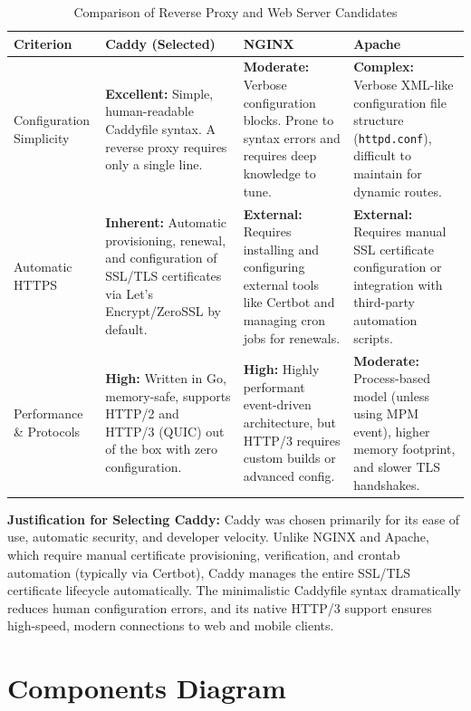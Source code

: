 \documentclass[letterpaper%
, oneside%
, 12pt%
, memoireprojet%
, english%
,creativecommons,hyperref, withAlgo2e %
]{thETS}
\begin{document}
\begin{table}[H]
\centering
\begin{tabular}{|p{2.5cm}|p{4.2cm}|p{4.2cm}|p{4.2cm}|}
\hline
\textbf{Criterion} & \textbf{Caddy (Selected)} & \textbf{NGINX} & \textbf{Apache} \\ \hline
Configuration Simplicity & \textbf{Excellent:} Simple, human-readable Caddyfile syntax. A reverse proxy requires only a single line. & \textbf{Moderate:} Verbose configuration blocks. Prone to syntax errors and requires deep knowledge to tune. & \textbf{Complex:} Verbose XML-like configuration file structure (\texttt{httpd.conf}), difficult to maintain for dynamic routes. \\ \hline
Automatic HTTPS & \textbf{Inherent:} Automatic provisioning, renewal, and configuration of SSL/TLS certificates via Let's Encrypt/ZeroSSL by default. & \textbf{External:} Requires installing and configuring external tools like Certbot and managing cron jobs for renewals. & \textbf{External:} Requires manual SSL certificate configuration or integration with third-party automation scripts. \\ \hline
Performance \& Protocols & \textbf{High:} Written in Go, memory-safe, supports HTTP/2 and HTTP/3 (QUIC) out of the box with zero configuration. & \textbf{High:} Highly performant event-driven architecture, but HTTP/3 requires custom builds or advanced config. & \textbf{Moderate:} Process-based model (unless using MPM event), higher memory footprint, and slower TLS handshakes. \\ \hline
\end{tabular}
\caption{Comparison of Reverse Proxy and Web Server Candidates}
\label{tab:proxy_comparison}
\end{table}

\textbf{Justification for Selecting Caddy:} Caddy was chosen primarily for its ease of use, automatic security, and developer velocity. Unlike NGINX and Apache, which require manual certificate provisioning, verification, and crontab automation (typically via Certbot), Caddy manages the entire SSL/TLS certificate lifecycle automatically. The minimalistic Caddyfile syntax dramatically reduces human configuration errors, and its native HTTP/3 support ensures high-speed, modern connections to web and mobile clients.



\section{Components Diagram}
\end{document}
